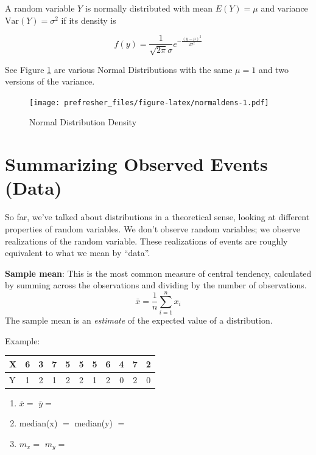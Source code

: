 \documentclass[]{book}
\theoremstyle{definition}
\theoremstyle{definition}
\theoremstyle{definition}
\theoremstyle{remark}
\let\BeginKnitrBlock\begin \let\EndKnitrBlock\end
\begin{document}

\BeginKnitrBlock{definition}[Normal Distribution]
\protect\hypertarget{def:unnamed-chunk-93}{}{\label{def:unnamed-chunk-93}
{} } A random variable \(Y\) is
normally distributed with mean \(E(Y)=\mu\) and variance
\(\text{Var}(Y)=\sigma^2\) if its density is

\[f(y)=\frac{1}{\sqrt{2\pi}\sigma}e^{-\frac{(y-\mu)^2}{2\sigma^2}}\]
\EndKnitrBlock{definition}

See Figure \ref{fig:normaldens} are various Normal Distributions with
the same \(\mu = 1\) and two versions of the variance.

\begin{figure}
\centering
\texttt{[image: prefresher\_files/figure-latex/normaldens-1.pdf]}
\caption{\label{fig:normaldens}Normal Distribution Density}
\end{figure}

\section{Summarizing Observed Events
(Data)}\label{summarizing-observed-events-data}

So far, we've talked about distributions in a theoretical sense, looking
at different properties of random variables. We don't observe random
variables; we observe realizations of the random variable. These
realizations of events are roughly equivalent to what we mean by
``data''.

\textbf{Sample mean}: This is the most common measure of central
tendency, calculated by summing across the observations and dividing by
the number of observations. \[\bar{x} = \frac{1}{n}\sum_{i=1}^{n}x_i\]
The sample mean is an \emph{estimate} of the expected value of a
distribution.

\begin{framed}
Example:  
\begin{center}
\begin{tabular}{|l|cccccccccc|}
\hline
X & 6 & 3 & 7 & 5 & 5 & 5 & 6 & 4 & 7 & 2\\
\hline
Y & 1 & 2 & 1 & 2 & 2 & 1 & 2 & 0 & 2 & 0\\
\hline
\end{tabular}
\end{center}

\begin{enumerate}
\item $\bar{x} = $ \hspace{3.1cm} $\bar{y} = $
\item median(x) $ = $ \hspace{1.5cm} median(y) $ = $
\item $m_x = $ \hspace{2.75cm} $m_y =$\\
\end{enumerate}
\end{framed}
\end{document}
